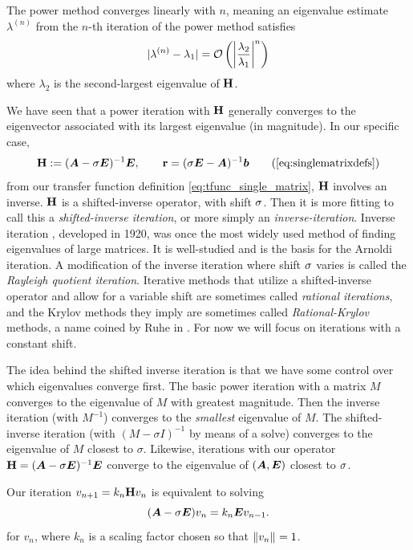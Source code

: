 The power method converges linearly with $n$, meaning an eigenvalue estimate $\lambda^{(n)}$ from the $n$-th iteration of the power method satisfies 
\[
| \lambda^{(n)} - \lambda_1 | = \mathcal{O}\left( \left| \frac{\lambda_2}{\lambda_1} \right|^n  \right)
\]
where $\lambda_2$ is the second-largest eigenvalue of $\textbf{\textup{H}}$.  

\medskip
{}
We have seen that a power iteration with $\textbf{\textup{H}}$ generally converges to the eigenvector associated with its largest eigenvalue (in magnitude).  In our specific case, 
\[
 \H := (\A - \xp \E)^{-1}\E, \qquad \Rr = (\xp \E-\A)^{-1}\Bb \tag{\ref{eq:singlematrixdefs}}
\]
from our transfer function definition \eqref{eq:tfunc_single_matrix}, $\textbf{\textup{H}}$ involves an inverse.  $\textbf{\textup{H}}$ is a shifted-inverse operator, with shift $\sigma$.  Then it is more fitting to call this a \emph{shifted-inverse iteration}, or more simply an \emph{inverse-iteration}.  Inverse iteration \cite{inv_iter}, developed in 1920,  was once the most widely used method of finding eigenvalues of large matrices.  It is well-studied and is the basis for the Arnoldi iteration.  A modification of the inverse iteration where shift $\sigma$ varies is called the \emph{Rayleigh quotient iteration}.   Iterative methods that utilize a shifted-inverse operator and allow for a variable shift are sometimes called \emph{rational iterations}, and the Krylov methods they imply are sometimes called \emph{Rational-Krylov} methods, a name coined by Ruhe in \cite{ruhe1994rational}.    For now we will focus on iterations with a constant shift.

The idea behind the shifted inverse iteration is that we have some control over which eigenvalues converge first.   The basic power iteration with a matrix $M$ converges to the eigenvalue of $M$ with greatest magnitude.  Then the inverse iteration (with $M^{-1}$) converges to the \emph{smallest} eigenvalue of $M$.  The shifted-inverse iteration (with $(M - \sigma I)^{-1}$ by means of a solve) converges to the eigenvalue of $M$ closest to $\sigma$.  Likewise, iterations with our operator $\textbf{\textup{H}}=(\bm{A} - \sigma \bm{E})^{-1}\bm{E}$ converge to the eigenvalue of $(\bm{A},\bm{E})$ closest to $\sigma$.

   
Our iteration $v_{n+1} = k_n \textbf{\textup{H}} v_n$ is equivalent to solving 
\begin{equation}
 (\bm{A} - \sigma \bm{E}) v_{n} = k_{n} \bm{E} v_{n-1}.
\label{eq:inv_recurrence}
\end{equation}
for $v_n$, where $k_n$ is a scaling factor chosen so that $\left\| v_n \right\|_{}=1$.

